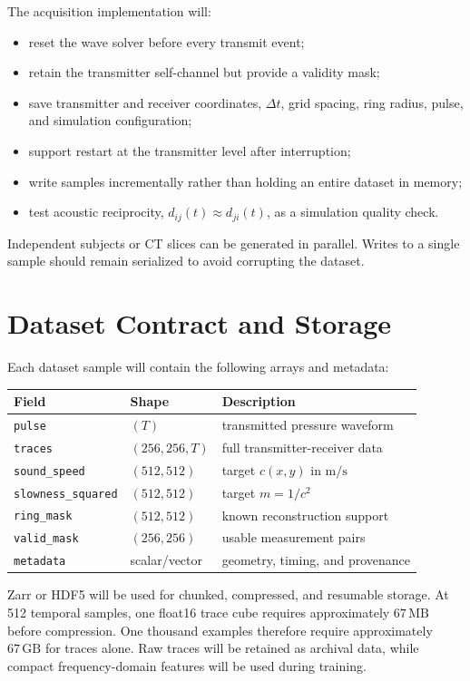\documentclass[11pt]{article}
\begin{document}
The acquisition implementation will:
\begin{itemize}
  \item reset the wave solver before every transmit event;
  \item retain the transmitter self-channel but provide a validity mask;
  \item save transmitter and receiver coordinates, $\Delta t$, grid spacing,
        ring radius, pulse, and simulation configuration;
  \item support restart at the transmitter level after interruption;
  \item write samples incrementally rather than holding an entire dataset in
        memory;
  \item test acoustic reciprocity,
        $d_{ij}(t)\approx d_{ji}(t)$, as a simulation quality check.
\end{itemize}

Independent subjects or CT slices can be generated in parallel. Writes to a
single sample should remain serialized to avoid corrupting the dataset.

\section{Dataset Contract and Storage}

Each dataset sample will contain the following arrays and metadata:
\begin{center}
\begin{tabular}{lll}
\toprule
Field & Shape & Description \\
\midrule
\texttt{pulse} & $(T)$ & transmitted pressure waveform \\
\texttt{traces} & $(256,256,T)$ & full transmitter-receiver data \\
\texttt{sound\_speed} & $(512,512)$ & target $c(x,y)$ in $\mathrm{m/s}$ \\
\texttt{slowness\_squared} & $(512,512)$ & target $m=1/c^2$ \\
\texttt{ring\_mask} & $(512,512)$ & known reconstruction support \\
\texttt{valid\_mask} & $(256,256)$ & usable measurement pairs \\
\texttt{metadata} & scalar/vector & geometry, timing, and provenance \\
\bottomrule
\end{tabular}
\end{center}

Zarr or HDF5 will be used for chunked, compressed, and resumable storage. At
512 temporal samples, one float16 trace cube requires approximately
$67\,\mathrm{MB}$ before compression. One thousand examples therefore require
approximately $67\,\mathrm{GB}$ for traces alone. Raw traces will be retained
as archival data, while compact frequency-domain features will be used during
training.
\end{document}

